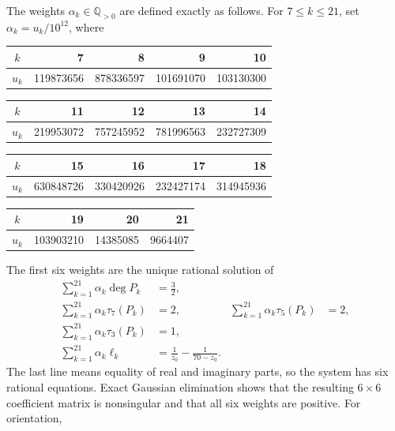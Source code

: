 \documentclass[preprint,12pt]{elsarticle}
\theoremstyle{definition}
\newcommand{\Q}{\mathbb Q}
\begin{document}
The weights $\alpha_k\in\Q_{>0}$ are defined exactly as follows.  For
$7\le k\le21$, set $\alpha_k=u_k/10^{12}$, where
\begin{center}
\small
\begin{tabular}{crrrr}
\toprule
$k$&7&8&9&10\\
\midrule
$u_k$&119873656&878336597&101691070&103130300\\
\bottomrule
\end{tabular}
\qquad
\begin{tabular}{crrrr}
\toprule
$k$&11&12&13&14\\
\midrule
$u_k$&219953072&757245952&781996563&232727309\\
\bottomrule
\end{tabular}

\medskip
\begin{tabular}{crrrr}
\toprule
$k$&15&16&17&18\\
\midrule
$u_k$&630848726&330420926&232427174&314945936\\
\bottomrule
\end{tabular}
\qquad
\begin{tabular}{crrr}
\toprule
$k$&19&20&21\\
\midrule
$u_k$&103903210&14385085&9664407\\
\bottomrule
\end{tabular}
\end{center}
The first six weights are the unique rational solution of
\begin{align}
 \sum_{k=1}^{21}\alpha_k\deg P_k&=\frac32,
 \label{eq:degree-balance}\\
 \sum_{k=1}^{21}\alpha_k\tau_7(P_k)&=2,
 &\sum_{k=1}^{21}\alpha_k\tau_5(P_k)&=2,
 \label{eq:profile75}\\
 \sum_{k=1}^{21}\alpha_k\tau_3(P_k)&=1,
 \label{eq:profile3}\\
 \sum_{k=1}^{21}\alpha_k\ell_k
 &=\frac1{z_0}-\frac1{70-z_0}.
 \label{eq:complex-weight-equation}
\end{align}
The last line means equality of real and imaginary parts, so the system has
six rational equations.  Exact Gaussian elimination shows that the resulting
$6\times6$ coefficient matrix is nonsingular and that all six weights are
positive.
For orientation,
\end{document}
